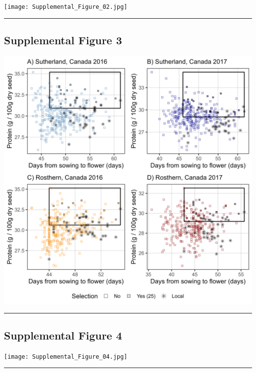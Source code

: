 \documentclass[
]{article}
\begin{document}
\texttt{[image: Supplemental\_Figure\_02.jpg]}

\begin{center}\rule{0.5\linewidth}{0.5pt}\end{center}

\hypertarget{supplemental-figure-3}{%
\subsection{Supplemental Figure 3}\label{supplemental-figure-3}}

\includegraphics{Supplemental_Figure_03.jpg}

\begin{center}\rule{0.5\linewidth}{0.5pt}\end{center}

\hypertarget{supplemental-figure-4}{%
\subsection{Supplemental Figure 4}\label{supplemental-figure-4}}

\texttt{[image: Supplemental\_Figure\_04.jpg]}

\begin{center}\rule{0.5\linewidth}{0.5pt}\end{center}
\end{document}
